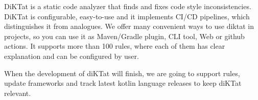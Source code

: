 \par DiKTat is a static code analyzer that finds and fixes code style inconsistencies. DiKTat is configurable, easy-to-use and it implements CI/CD pipelines, which distinguishes it from analogues. We offer many convenient ways to use diktat in projects, so you can use it as Maven/Gradle plugin, CLI tool, Web or github actions. It supports more than 100 rules, where each of them has clear explanation and can be configured by user.
\par When the development of diKTat will finish, we are going to support rules, update frameworks and track latest kotlin language releases to keep diKTat relevant.